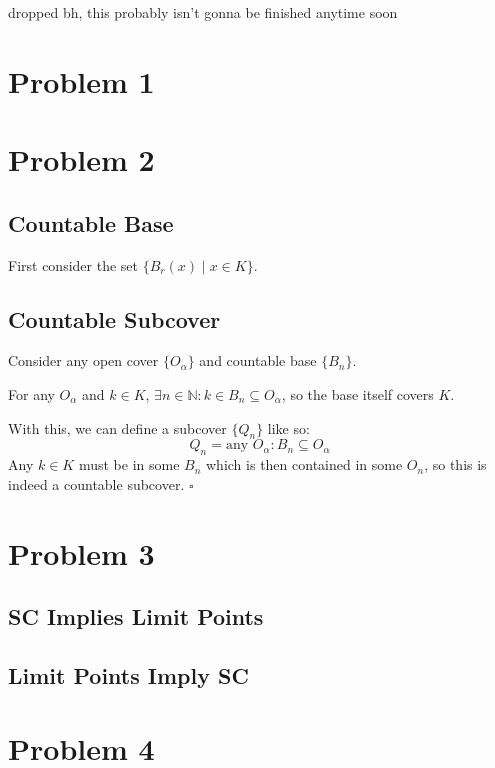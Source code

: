 \documentclass[12pt]{article}
\newcommand{\N}{\mathbb{N}}
\begin{document}
{
  \color{red}
  dropped bh, this probably isn't gonna be finished anytime soon
}

\section{Problem 1}

\section{Problem 2}

\subsection{Countable Base}

First consider the set $\{B_r(x) \mid x \in K\}$.

\subsection{Countable Subcover}

Consider any open cover $\{O_\alpha\}$ and countable base $\{B_n\}$.

For any $O_\alpha$ and $k \in K$, $\exists n \in \N: k \in B_n \subseteq O_\alpha$,
so the base itself covers $K$.

With this, we can define a subcover $\{Q_n\}$ like so:
\[Q_n = \text{any } O_\alpha: B_n \subseteq O_\alpha\]
Any $k \in K$ must be in some $B_n$ which is then contained in some $O_n$,
so this is indeed a countable subcover. $\square$

\section{Problem 3}

\subsection{SC Implies Limit Points}

\subsection{Limit Points Imply SC}

\pagebreak

\section{Problem 4}
\end{document}
